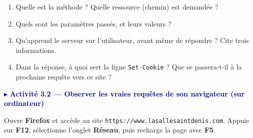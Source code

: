 \documentclass[11pt,a4paper]{article}
\newif\ifprof
\newcommand{\lignes}[1]{\par\foreach \i in {1,...,#1}{\vspace{8.5mm}\hrule height 0.3pt}\vspace{2mm}}
\newcommand{\reponse}[2]{\ifprof\par{\raggedright\textcolor{corr}{#2}\par}\else\lignes{#1}\fi}
\newcommand{\activite}[1]{%
  \Needspace{6\baselineskip}%
  \begin{tcolorbox}[enhanced,colback=bleuclair,colframe=navy!70,boxrule=0.5pt,arc=3pt,
    left=6pt,top=3pt,bottom=3pt,before skip=10pt,after skip=6pt]
  \textcolor{navy}{$\blacktriangleright$ \textbf{#1}}\end{tcolorbox}}
\newcommand{\ensei}[1]{\ifprof\begin{tcolorbox}[enhanced,colback=gris,colframe=corr!60,boxrule=0.5pt,arc=2pt,
  left=5pt,right=5pt,top=3pt,bottom=3pt,before skip=6pt,after skip=6pt,fontupper=\small]
  \textcolor{corr}{\textbf{Note enseignant.}} #1\end{tcolorbox}\fi}
\begin{document}
\begin{enumerate}[leftmargin=*,label=\alph*)]
\item Quelle est la méthode ? Quelle ressource (chemin) est demandée ?
\reponse{1}{GET ; \texttt{/search}.}
\item Quels sont les paramètres passés, et leurs valeurs ?
\reponse{1}{\texttt{q} = « snt seconde » (le \texttt{+} code l'espace) et \texttt{lang} = « fr ».}
\item Qu'apprend le serveur sur l'utilisateur, avant même de répondre ? Cite trois informations.
\reponse{2}{Le système d'exploitation (\texttt{Windows NT 10.0}, c'est-à-dire Windows 10 ou 11 : l'en-tête ne les distingue pas), le navigateur (Firefox 128), la langue préférée (français), et qu'il a déjà visité le site (cookies \texttt{session} et \texttt{theme}).}
\item Dans la réponse, à quoi sert la ligne \texttt{Set-Cookie} ? Que se passera-t-il à la prochaine requête vers ce site ?
\reponse{2}{Le serveur demande au navigateur de stocker un petit fichier texte ; le navigateur le renverra automatiquement dans l'en-tête \texttt{Cookie} de chaque requête suivante vers ce domaine. Le serveur peut ainsi « reconnaître » l'utilisateur d'une requête à l'autre : HTTP seul n'a pas de mémoire.}
\end{enumerate}

\ensei{Précisions : le \texttt{+} de \texttt{q=snt+seconde} code l'espace ; la requête réelle du navigateur contient davantage d'en-têtes (\texttt{Accept}, \texttt{Accept-Encoding}, \texttt{Referer}…), l'exemple est simplifié. \texttt{Windows NT 10.0} désigne Windows 10 \emph{ou} 11. POST ne chiffre rien : c'est HTTPS qui protège la transmission (vu au livret 1).}

\activite{Activité 3.2 — Observer les vraies requêtes de son navigateur (sur ordinateur)}

Ouvre \textbf{Firefox} et accède au site \texttt{https://www.lasallesaintdenis.com}. Appuie sur \textbf{F12}, sélectionne l'onglet \textbf{Réseau}, puis recharge la page avec \textbf{F5}.
\end{document}
